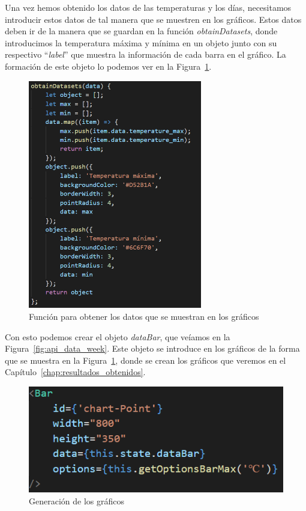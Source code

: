 \documentclass[a4paper, 12pt]{book}
\begin{document}
\vspace{5mm}
Una vez hemos obtenido los datos de las temperaturas y los días, necesitamos introducir estos datos de tal manera que se muestren en los gráficos. Estos datos deben ir de la manera que se guardan en la función \textit{obtainDatasets}, donde introducimos la temperatura máxima y mínima en un objeto junto con su respectivo ``\textit{label}''  que muestra la información de cada barra en el gráfico. La formación de este objeto lo podemos ver en la Figura~\ref{fig:obtain_datasets}.
\begin{figure}[h]
  \centering
  \includegraphics[height=10cm]{img_usadas/obtain_datasets.png}
  \caption{Función para obtener los datos que se muestran en los gráficos}
  \label{fig:obtain_datasets}
\end{figure}

\vspace{5mm}
Con esto podemos crear el objeto \textit{dataBar}, que veíamos en la Figura~\ref{fig:api_data_week}. Este objeto se introduce en los gráficos de la forma que se muestra en la Figura~\ref{fig:obtain_datasets}, donde se crean los gráficos que veremos en el Capítulo~\ref{chap:resultados_obtenidos}.
\begin{figure}[h]
  \centering
  \includegraphics{img_usadas/chart_data.png}
  \caption{Generación de los gráficos}
  \label{fig:chart_data}
\end{figure}
\end{document}
